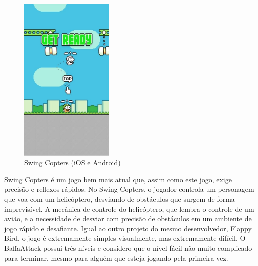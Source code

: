 \begin{figure}[h]
    \centering
    \includegraphics[width=0.4\textwidth]{swing-copters.jpg}
    \caption{Swing Copters (iOS e Android)}
\end{figure}
Swing Copters é um jogo bem mais atual que, assim como este jogo, exige precisão e reflexos rápidos. No Swing Copters, o jogador controla um personagem que voa com um helicóptero, desviando de obstáculos que surgem de forma imprevisível. A mecânica de controle do helicóptero, que lembra o controle de um avião, e a necessidade de desviar com precisão de obstáculos em um ambiente de jogo rápido e desafiante. Igual ao outro projeto do mesmo desenvolvedor, Flappy Bird, o jogo é extremamente simples visualmente, mas extremamente difícil. O BaffaAttack possui três níveis e considero que o nível fácil não muito complicado para terminar, mesmo para alguém que esteja jogando pela primeira vez.


